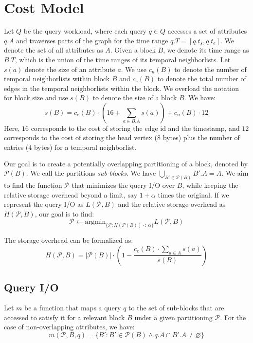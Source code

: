 \documentclass[twocolumn]{svjour3}          %
\let\emptyset\varnothing
\begin{document}
\section{Cost Model}
Let $Q$ be the query workload, where each query $q\in Q$ accesses a set of
attributes $q.A$ and traverses parts of the graph for the time range
$q.T=[q.t_s,q.t_e]$. We denote the set of all attributes as $A$. Given a block
$B$, we denote its time range as $B.T$, which is the union of the time ranges
of its temporal neighborlists. Let $s(a)$ denote the size of an attribute $a$.
We use $c_n(B)$ to denote the number of temporal neighborlists within block
$B$ and $c_e(B)$ to denote the total number of edges in the temporal
neighborlists within the block. We overload the notation for block size and
use $s(B)$ to denote the size of a block $B$. We have: 
\begin{equation}
s(B) = c_e(B) \cdot \left(16 + \sum_{a\in B.A} s(a)\right) + c_n(B) \cdot 12  
\end{equation}
Here, $16$ corresponds to the cost of storing the edge id and the timestamp,
and $12$ corresponds to the cost of storing the head vertex ($8$ bytes) plus
the number of entries ($4$ bytes) for a temporal neighborlist. 

Our goal is to create a potentially overlapping partitioning of a block,
denoted by $\mathcal{P}(B)$. We call the partitions \emph{sub-blocks}. We have
$\bigcup_{B'\in \mathcal{P}(B)} B'.A = A$. We aim to find the function
$\mathcal{P}$ that minimizes the query I/O over $B$, while keeping the
relative storage overhead beyond a limit, say $1+\alpha$ times the original.
If we represent the query I/O as $L(\mathcal{P}, B)$ and the relative storage
overhead as $H(\mathcal{P}, B)$, our goal is to find:
\begin{equation}
\mathcal{P} \leftarrow \mbox{argmin}_{\{\mathcal{P}: H(\mathcal{P}(B)) < \alpha\}} L(\mathcal{P},B)
\end{equation}

The storage overhead can be formalized as:
\begin{equation}
H(\mathcal{P}, B) = |\mathcal{P}(B)|\cdot\left(1-\frac{c_e(B)\cdot \sum_{a\in A} s(a)}{s(B)}\right) 
\end{equation}

\subsection{Query I/O}

Let $m$ be a function that maps a query $q$ to the set of sub-blocks that are
accessed to satisfy it for a relevant block $B$ under a given partitioning
$\mathcal{P}$. For the case of non-overlapping attributes, we have:
\begin{equation}
m(\mathcal{P}, B, q) = \{B': B'\in \mathcal{P}(B) \wedge q.A \cap B'.A \ne \emptyset\}  
\end{equation}
\end{document}
